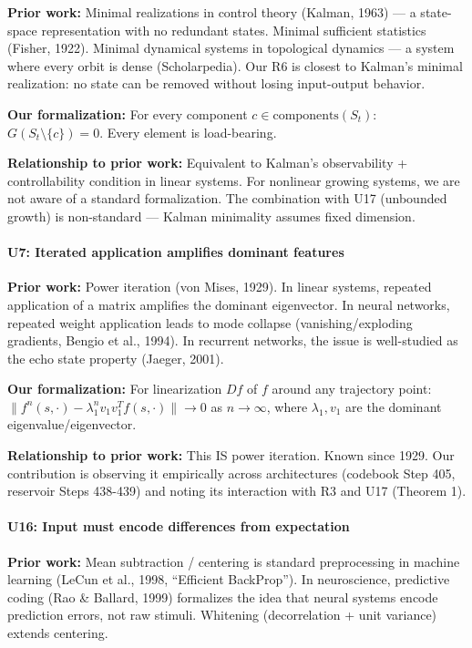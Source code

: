 \documentclass[
  11pt,
]{article}
\begin{document}
\textbf{Prior work:} Minimal realizations in control theory (Kalman,
1963) --- a state-space representation with no redundant states. Minimal
sufficient statistics (Fisher, 1922). Minimal dynamical systems in
topological dynamics --- a system where every orbit is dense
(Scholarpedia). Our R6 is closest to Kalman's minimal realization: no
state can be removed without losing input-output behavior.

\textbf{Our formalization:} For every component
\(c \in \text{components}(S_t)\): \(G(S_t \setminus \{c\}) = 0\). Every
element is load-bearing.

\textbf{Relationship to prior work:} Equivalent to Kalman's
observability + controllability condition in linear systems. For
nonlinear growing systems, we are not aware of a standard formalization.
The combination with U17 (unbounded growth) is non-standard --- Kalman
minimality assumes fixed dimension.

\paragraph{U7: Iterated application amplifies dominant
features}\label{u7-iterated-application-amplifies-dominant-features}

\textbf{Prior work:} Power iteration (von Mises, 1929). In linear
systems, repeated application of a matrix amplifies the dominant
eigenvector. In neural networks, repeated weight application leads to
mode collapse (vanishing/exploding gradients, Bengio et al., 1994). In
recurrent networks, the issue is well-studied as the echo state property
(Jaeger, 2001).

\textbf{Our formalization:} For linearization \(Df\) of \(f\) around any
trajectory point:
\(\|f^n(s, \cdot) - \lambda_1^n v_1 v_1^T f(s, \cdot)\| \to 0\) as
\(n \to \infty\), where \(\lambda_1, v_1\) are the dominant
eigenvalue/eigenvector.

\textbf{Relationship to prior work:} This IS power iteration. Known
since 1929. Our contribution is observing it empirically across
architectures (codebook Step 405, reservoir Steps 438-439) and noting
its interaction with R3 and U17 (Theorem 1).

\paragraph{U16: Input must encode differences from
expectation}\label{u16-input-must-encode-differences-from-expectation}

\textbf{Prior work:} Mean subtraction / centering is standard
preprocessing in machine learning (LeCun et al., 1998, ``Efficient
BackProp''). In neuroscience, predictive coding (Rao \& Ballard, 1999)
formalizes the idea that neural systems encode prediction errors, not
raw stimuli. Whitening (decorrelation + unit variance) extends
centering.
\end{document}
